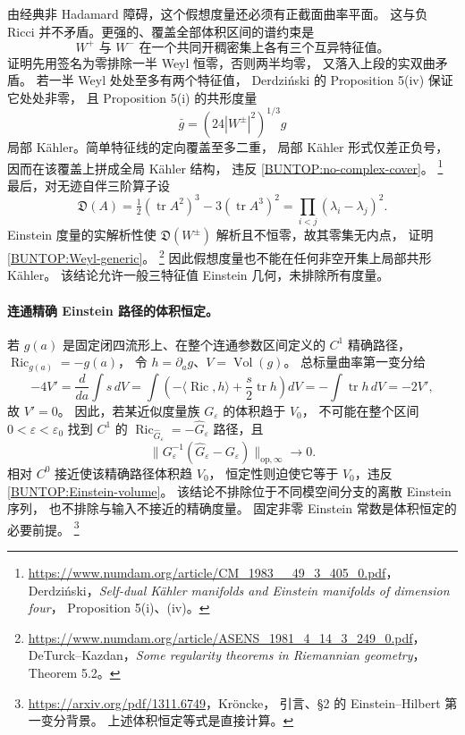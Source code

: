 \documentclass[UTF8,fontset=fandol,zihao=-4,oneside,openany]{ctexbook}
\theoremstyle{cjkplain}
\numberwithin{equation}{chapter}
\begin{document}
由经典非 Hadamard 障碍，这个假想度量还必须有正截面曲率平面。
这与负 Ricci 并不矛盾。更强的、覆盖全部体积区间的谱约束是
\begin{equation}
 W^+\text{ 与 }W^-
 \text{ 在一个共同开稠密集上各有三个互异特征值。}
 \label{BUNTOP:Weyl-generic}
\end{equation}
证明先用签名为零排除一半 Weyl 恒零，否则两半均零，
又落入上段的实双曲矛盾。
若一半 Weyl 处处至多有两个特征值，
Derdzi\'nski 的 Proposition 5(iv) 保证它处处非零，
且 Proposition 5(i) 的共形度量
\[
 \bar g=(24|W^\pm|^2)^{1/3}g
\]
局部 K\"ahler。简单特征线的定向覆盖至多二重，
局部 K\"ahler 形式仅差正负号，因而在该覆盖上拼成全局 K\"ahler 结构，
违反 \eqref{BUNTOP:no-complex-cover}。%
\footnote{\url{https://www.numdam.org/article/CM_1983__49_3_405_0.pdf}，
Derdzi\'nski，\emph{Self-dual K\"ahler manifolds and Einstein manifolds of dimension four}，
Proposition 5(i)、(iv)。}
最后，对无迹自伴三阶算子设
\[
 \mathfrak D(A)=\tfrac12(\operatorname{tr}A^2)^3
                -3(\operatorname{tr}A^3)^2
              =\prod_{i<j}(\lambda_i-\lambda_j)^2 .
\]
Einstein 度量的实解析性使
\(\mathfrak D(W^\pm)\) 解析且不恒零，故其零集无内点，
证明 \eqref{BUNTOP:Weyl-generic}。%
\footnote{\url{https://www.numdam.org/article/ASENS_1981_4_14_3_249_0.pdf}，
DeTurck--Kazdan，\emph{Some regularity theorems in Riemannian geometry}，
Theorem 5.2。}
因此假想度量也不能在任何非空开集上局部共形 K\"ahler。
该结论允许一般三特征值 Einstein 几何，未排除所有度量。

\paragraph{连通精确 Einstein 路径的体积恒定。}
若 \(g(a)\) 是固定闭四流形上、在整个连通参数区间定义的
\(C^1\) 精确路径，\(\operatorname{Ric}_{g(a)}=-g(a)\)，
令 \(h=\partial_a g\)、\(V=\operatorname{Vol}(g)\)。
总标量曲率第一变分给
\[
 -4V'=\frac{d}{da}\int s\,dV
 =\int\left(-\langle\operatorname{Ric},h\rangle
                +\frac s2\operatorname{tr}h\right)dV
 =-\int\operatorname{tr}h\,dV=-2V',
\]
故 \(V'=0\)。
因此，若某近似度量族 \(G_\varepsilon\) 的体积趋于 \(V_0\)，
不可能在整个区间 \(0<\varepsilon<\varepsilon_0\)
找到 \(C^1\) 的 \(\operatorname{Ric}_{\widehat G_\varepsilon}
=-\widehat G_\varepsilon\) 路径，且
\[
 \|G_\varepsilon^{-1}(\widehat G_\varepsilon-G_\varepsilon)
       \|_{\mathrm{op},\infty}\to0.
\]
相对 \(C^0\) 接近使该精确路径体积趋 \(V_0\)，
恒定性则迫使它等于 \(V_0\)，违反
\eqref{BUNTOP:Einstein-volume}。
该结论不排除位于不同模空间分支的离散 Einstein 序列，
也不排除与输入不接近的精确度量。
固定非零 Einstein 常数是体积恒定的必要前提。%
\footnote{\url{https://arxiv.org/pdf/1311.6749}，Kr\"oncke，
引言、§2 的 Einstein--Hilbert 第一变分背景。
上述体积恒定等式是直接计算。}
\end{document}
